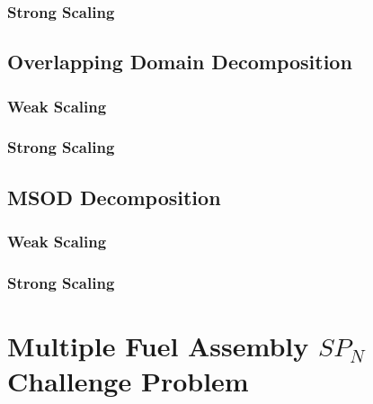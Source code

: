 \subsubsection{Strong Scaling}
\label{subsubsec:pure_strong}

\subsection{Overlapping Domain Decomposition}
\label{subsec:overlapping_domain_decomp}

\subsubsection{Weak Scaling}
\label{subsubsec:overlapping_weak}

\subsubsection{Strong Scaling}
\label{subsubsec:overlapping_strong}

\subsection{MSOD Decomposition}
\label{subsec:msod_decomposition}

\subsubsection{Weak Scaling}
\label{subsubsec:msod_weak}

\subsubsection{Strong Scaling}
\label{subsubsec:msod_strong}

\section{Multiple Fuel Assembly $SP_N$ Challenge Problem}
\label{sec:spn_challenge_problem}
